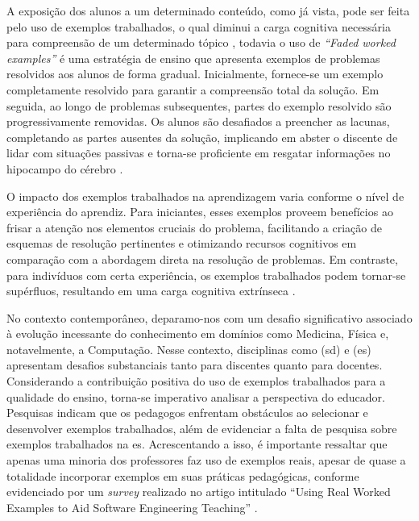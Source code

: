 A exposição dos alunos a um determinado conteúdo, como já vista, pode ser feita pelo uso de exemplos trabalhados, o qual diminui a carga cognitiva necessária para compreensão de um determinado tópico \cite{Robert.Atkinson-etal:2000}, todavia o uso de \textit{``Faded worked examples''} é uma estratégia de ensino que apresenta exemplos de problemas resolvidos aos alunos de forma gradual. Inicialmente, fornece-se um exemplo completamente resolvido para garantir a compreensão total da solução. Em seguida, ao longo de problemas subsequentes, partes do exemplo resolvido são progressivamente removidas. Os alunos são desafiados a preencher as lacunas, completando as partes ausentes da solução, implicando em abster o discente de lidar com situações passivas e torna-se proficiente em resgatar informações no hipocampo do cérebro \cite{Skudder-LuxtonReilly:2014}.

O impacto dos exemplos trabalhados na aprendizagem varia conforme o nível de experiência do aprendiz. Para iniciantes, esses exemplos proveem benefícios ao frisar a atenção nos elementos cruciais do problema, facilitando a criação de esquemas de resolução pertinentes e otimizando recursos cognitivos em comparação com a abordagem direta na resolução de problemas. Em contraste, para indivíduos com certa experiência, os exemplos trabalhados podem tornar-se supérfluos, resultando em uma carga cognitiva extrínseca \cite{Skudder-LuxtonReilly:2014}.

No contexto contemporâneo, deparamo-nos com um desafio significativo associado à evolução incessante do conhecimento em domínios como Medicina, Física e, notavelmente, a Computação. Nesse contexto, disciplinas como (\gls{sd}) e (\gls{es}) apresentam desafios substanciais tanto para discentes quanto para docentes. Considerando a contribuição positiva do uso de exemplos trabalhados para a qualidade do ensino, torna-se imperativo analisar a perspectiva do educador. Pesquisas indicam que os pedagogos enfrentam obstáculos ao selecionar e desenvolver exemplos trabalhados, além de evidenciar a falta de pesquisa sobre exemplos trabalhados na \gls{es}. Acrescentando a isso, é importante ressaltar que apenas uma minoria dos professores faz uso de exemplos reais, apesar de quase a totalidade incorporar exemplos em suas práticas pedagógicas, conforme evidenciado por um \textit{survey} realizado no artigo intitulado ``Using Real Worked Examples to Aid Software Engineering Teaching'' \cite{Simone.Tonhao-etal:2021}.

